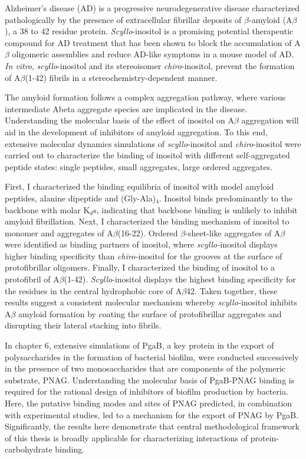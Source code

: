 Alzheimer's disease (AD) is a progressive neurodegenerative disease characterized pathologically by the presence of extracellular fibrillar deposits of $\beta$-amyloid (A$\beta$), a 38 to 42 residue protein. \emph{Scyllo}-inositol is a promising potential therapeutic compound for AD treatment that has been shown to block the accumulation of A$\beta$ oligomeric assemblies and reduce AD-like symptoms in a mouse model of AD. \emph{In vitro}, \emph{scyllo}-inositol and its stereoisomer \emph{chiro}-inositol, prevent the formation of A$\beta$(1-42) fibrils in a stereochemistry-dependent manner. 

The amyloid formation follows a complex aggregation pathway, where various intermediate Abeta aggregate species are implicated in the disease. Understanding the molecular basis of the effect of inositol on A$\beta$ aggregation will aid in the development of inhibitors of amyloid aggregation. To this end, extensive molecular dynamics simulations of \emph{scyllo}-inositol and \emph{chiro}-inositol were carried out to characterize the binding of inositol with different self-aggregated peptide states: single peptides, small aggregates, large ordered aggregates. 

First, I characterized the binding equilibria of inositol with model amyloid peptides, alanine dipeptide and (Gly-Ala)$_4$.  Inositol binds predominantly to the backbone with molar K$_d$s, indicating that backbone binding is unlikely to inhibit amyloid fibrillation. Next, I characterized the binding mechanism of inositol to monomer and aggregates of A$\beta$(16-22). Ordered $\beta$-sheet-like aggregates of A$\beta$ were identified as binding partners of inositol, where \textit{scyllo-}inositol displays higher binding specificity than \textit{chiro-}inositol for the grooves at the surface of protofibrillar oligomers. Finally, I characterized the binding of inositol to a protofibril of A$\beta$(1-42).  \textit{Scyllo}-inositol displays the highest binding specificity for the residues in the central hydrophobic core of A$\beta$42.  Taken together, these results suggest a consistent molecular mechanism whereby \textit{scyllo-}inositol inhibits A$\beta$ amyloid formation by coating the surface of protofibrillar aggregates and disrupting their lateral stacking into fibrils.

In chapter 6, extensive simulations of PgaB, a key protein in the export of polysaccharides in the formation of bacterial biofilm, were conducted successively in the presence of two monosaccharides that are components of the polymeric substrate, PNAG. Understanding the molecular basis of PgaB-PNAG binding is required for the rational design of inhibitors of biofilm production by bacteria. Here, the putative binding modes and sites of PNAG predicted, in combination with experimental studies, led to a mechanism for the export of PNAG by PgaB. Significantly, the results here demonstrate that central methodological framework of this thesis is broadly applicable for characterizing interactions of protein-carbohydrate binding.